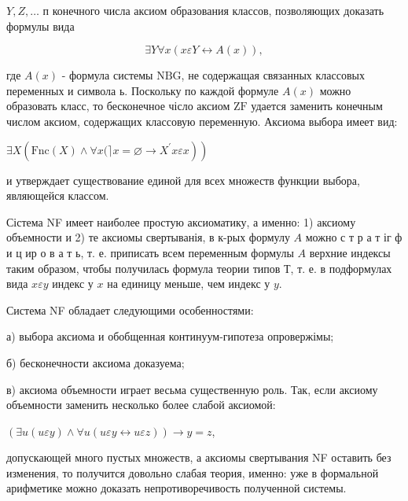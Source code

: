 \documentclass[10pt]{article}
\begin{document}
$Y, Z, \ldots$ п конечного числа аксиом образования классов, позволяющих доказать формулы вида



\[

\exists Y \forall x(x \varepsilon Y \leftrightarrow A(x)),

\]



где $A(x)$ - формула системы $\mathrm{NBG}$, не содержащая связанных классовых переменных и символа ь. Поскольку по каждой формуле $A(x)$ можно образовать класс, то бесконечное чісло аксиом $\mathrm{ZF}$ удается заменить конечным числом аксиом, содержащих классовую переменную. Аксиома выбора имеет вид:



$\left.\exists X\left(\mathrm{Fnc}(X) \wedge \forall x(\rceil x=\varnothing \longrightarrow X^{\prime} x \varepsilon x\right)\right)$



и утверждает существование единой для всех множеств функции выбора, являющейся классом.



Сістема NF имеет наиболее простую аксиоматику, а именно: 1) аксиому объемности и 2) те аксиомы свертыванія, в к-рых формулу $A$ можно с т р а т іг ф и ц ир о в а т ь, т. е. приписать всем переменным формулы $A$ верхние индексы таким образом, чтобы получилась формула теории типов Т, т. е. в подформулах вида $x \varepsilon y$ индекс у $x$ на единицу меньше, чем индекс у $y$.



Система NF обладает следующими особенностями:



а) выбора аксиома и обобщенная континуум-гипотеза опровержімы;



б) бесконечности аксиома доказуема;



в) аксиома объемности играет весьма существенную роль. Так, если аксиому объемности заменить несколько более слабой аксиомой:



$(\exists u(u \varepsilon y) \wedge \forall u(u \varepsilon y \leftrightarrow u \varepsilon z)) \longrightarrow y=z$,



допускающей много пустых множеств, а аксиомы свертывания NF оставить без изменения, то получится довольно слабая теория, именно: уже в формальной арифметике можно доказать непротиворечивость полученной системы.
\end{document}
